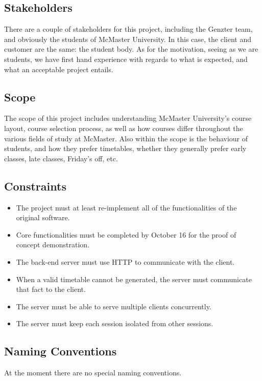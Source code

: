 \documentclass[12pt]{article}
\begin{document}
\subsection{Stakeholders}
There are a couple of stakeholders for this project, including the Genzter team, and obviously the students of McMaster University. In this case, the client and customer are the same: the student body. As for the motivation, seeing as we are students, we have first hand experience with regards to what is expected, and what an acceptable project entails.

\subsection{Scope}
The scope of this project includes understanding McMaster University's course layout, course selection process, as well as how courses differ throughout the various fields of study at McMaster. Also within the scope is the behaviour of students, and how they prefer timetables, whether they generally prefer early classes, late classes, Friday's off, etc. 

\subsection{Constraints}
\begin{itemize}
  \item The project must at least re-implement all of the functionalities of the original software.
  \item Core functionalities must be completed by October 16 for the proof of concept demonstration.
  \item The back-end server must use HTTP to communicate with the client.
  \item When a valid timetable cannot be generated, the server must communicate that fact to the client.
  \item The server must be able to serve multiple clients concurrently.
  \item The server must keep each session isolated from other sessions.
\end{itemize}

\subsection{Naming Conventions}
At the moment there are no special naming conventions.
\end{document}
